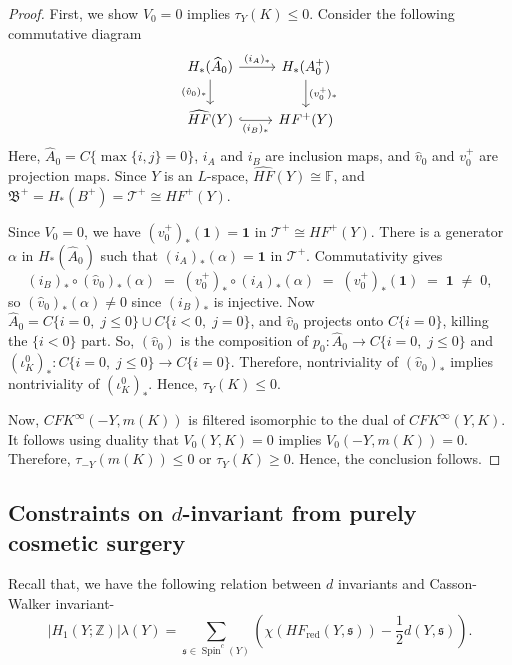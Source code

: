 \documentclass[12pt]{amsart}
\theoremstyle{definition}
\theoremstyle{definition}
\newcommand{\CFKINFTY}{{CFK}^{\infty}}
\newcommand{\din}{d}
\begin{document}
\begin{proof}
First, we show $V_0 = 0$ implies $\tau_Y(K) \leq 0$. Consider the following commutative diagram 
\[
\begin{tikzcd}
H_*(\widehat{A}_0) \ar[r, "(i_A)_*"] \ar[d, "(\hat{v}_0)_*"']
& H_*(A_0^+) \ar[d, "(v_0^+)_*"] \\
\widehat{HF}(Y) \ar[r, hookrightarrow, "(i_B)_*"']
& HF^+(Y)
\end{tikzcd}
\]
Here, $\widehat{A}_0 = C\{ \max \{ i,j \}=0\}$, $i_A$ and $i_B$ are inclusion maps, and $\hat{v}_0$ and $v_0^+$ are projection maps. Since $Y$ is an $L$-space,
$\widehat{HF}(Y) \cong \mathbb{F}$, and $\mathfrak{B}^+ = H_*(B^+) =\mathcal{T}^+ \cong HF^+(Y)$.   

Since $V_0 = 0$, we have $(v_0^+)_*(\mathbf{1}) = \mathbf{1}$
in $\mathcal{T}^+ \cong HF^+(Y)$. There is  a generator $\alpha$ in $H_*(\widehat{A}_0)$ such that  $(i_A)_*(\alpha)= \mathbf{1}$
in $\mathcal{T}^+$. Commutativity gives
\[
(i_B)_* \circ (\hat{v}_0)_*(\alpha)
\;=\; (v_0^+)_* \circ (i_A)_*(\alpha)
\;=\; (v_0^+)_*(\mathbf{1})
\;=\; \mathbf{1} \;\neq\; 0,
\]
so $(\hat{v}_0)_*(\alpha) \neq 0$ since $(i_B)_*$ is injective. Now $\widehat{A}_0 = C\{i = 0,\; j \leq 0\} \cup C\{i < 0,\; j = 0\}$,
and $\hat{v}_0$ projects onto $C\{i = 0\}$, killing the $\{i < 0\}$ part.
So, $(\hat{v}_0)$ is the composition  of $p_0:\widehat{A}_0 \to  C\{i = 0,\; j \leq 0\}$ and $(\iota_K^0)_*:C\{i = 0,\; j \leq 0\} \to C\{i = 0\} $. Therefore,  nontriviality of $(\hat{v}_0)_*$ implies nontriviality of $(\iota_K^0)_*$. Hence,
$\tau_Y(K) \leq 0$.

\smallskip

Now, $\CFKINFTY(-Y,m(K))$ is filtered isomorphic to the dual of $\CFKINFTY(Y,K)$. It follows using duality that $V_0(Y,K)=0$ implies $V_0(-Y,m(K))=0$. Therefore, $\tau_{-Y}(m(K)) \leq 0$ or $\tau_Y(K) \geq 0$. Hence, the conclusion follows.

\end{proof}



\subsection*{Constraints on $d$-invariant  from purely cosmetic surgery}
Recall that, we have the following relation between $\din$ invariants and Casson-Walker invariant-
\[ \left|H_1(Y ; \mathbb{Z})\right| \lambda(Y)=\sum_{\mathfrak{s} \in \operatorname{Spin}^c(Y)}\left(\chi\left(H F_{\mathrm{red}}(Y, \mathfrak{s})\right)-\frac{1}{2} \din (Y, \mathfrak{s})\right).\]
\end{document}
